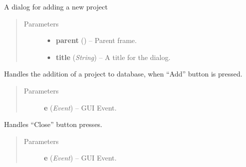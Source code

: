 \documentclass[letterpaper,10pt,english]{sphinxmanual}
\begin{document}
\begin{fulllineitems}
\label{wos:wos.AddProjectDialog}
A dialog for adding a new project
\begin{quote}\begin{description}
\item[{Parameters}] \leavevmode\begin{itemize}
\item {} 
\textbf{parent} () -- Parent frame.

\item {} 
\textbf{title} (\emph{String}) -- A title for the dialog.

\end{itemize}

\end{description}\end{quote}

\begin{fulllineitems}
\label{wos:wos.AddProjectDialog.OnAdd}
Handles the addition of a project to database, when ``Add'' button
is pressed.
\begin{quote}\begin{description}
\item[{Parameters}] \leavevmode
\textbf{e} (\emph{Event}) -- GUI Event.

\end{description}\end{quote}

\end{fulllineitems}


\begin{fulllineitems}
\label{wos:wos.AddProjectDialog.OnClose}
Handles ``Close'' button presses.
\begin{quote}\begin{description}
\item[{Parameters}] \leavevmode
\textbf{e} (\emph{Event}) -- GUI Event.

\end{description}\end{quote}

\end{fulllineitems}


\end{fulllineitems}
\end{document}
